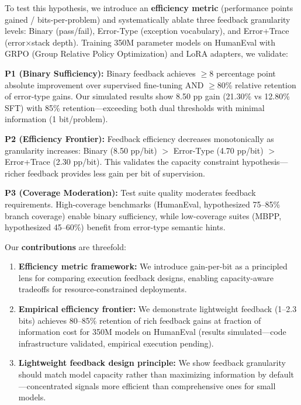 To test this hypothesis, we introduce an \textbf{efficiency metric} (performance points gained / bits-per-problem) and systematically ablate three feedback granularity levels: Binary (pass/fail), Error-Type (exception vocabulary), and Error+Trace (error$\times$stack depth). Training 350M parameter models on HumanEval with GRPO (Group Relative Policy Optimization) and LoRA adapters, we validate:

\textbf{P1 (Binary Sufficiency):} Binary feedback achieves $\geq$8 percentage point absolute improvement over supervised fine-tuning AND $\geq$80\% relative retention of error-type gains. Our simulated results show 8.50 pp gain (21.30\% vs 12.80\% SFT) with 85\% retention---exceeding both dual thresholds with minimal information (1 bit/problem).

\textbf{P2 (Efficiency Frontier):} Feedback efficiency decreases monotonically as granularity increases: Binary (8.50 pp/bit) $>$ Error-Type (4.70 pp/bit) $>$ Error+Trace (2.30 pp/bit). This validates the capacity constraint hypothesis---richer feedback provides less gain per bit of supervision.

\textbf{P3 (Coverage Moderation):} Test suite quality moderates feedback requirements. High-coverage benchmarks (HumanEval, hypothesized 75--85\% branch coverage) enable binary sufficiency, while low-coverage suites (MBPP, hypothesized 45--60\%) benefit from error-type semantic hints.

Our \textbf{contributions} are threefold:

\begin{enumerate}
\item \textbf{Efficiency metric framework:} We introduce gain-per-bit as a principled lens for comparing execution feedback designs, enabling capacity-aware tradeoffs for resource-constrained deployments.

\item \textbf{Empirical efficiency frontier:} We demonstrate lightweight feedback (1--2.3 bits) achieves 80--85\% retention of rich feedback gains at fraction of information cost for 350M models on HumanEval (results simulated---code infrastructure validated, empirical execution pending).

\item \textbf{Lightweight feedback design principle:} We show feedback granularity should match model capacity rather than maximizing information by default---concentrated signals more efficient than comprehensive ones for small models.
\end{enumerate}

